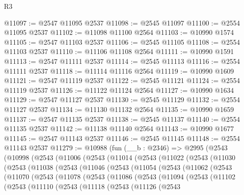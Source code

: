 \begin{lexlean}{R3}
\begin{coremodule}
@11097 := @2547 @11095 @2537
@11098 := @2545 @11097
@11100 := @2554 @11095 @2537
@11102 := @11098 @11100 @2564
@11103 := @10990 @1574
@11105 := @2547 @11103 @2537
@11106 := @2545 @11105
@11108 := @2554 @11103 @2537
@11110 := @11106 @11108 @2564
@11111 := @10990 @1591
@11113 := @2547 @11111 @2537
@11114 := @2545 @11113
@11116 := @2554 @11111 @2537
@11118 := @11114 @11116 @2564
@11119 := @10990 @1609
@11121 := @2547 @11119 @2537
@11122 := @2545 @11121
@11124 := @2554 @11119 @2537
@11126 := @11122 @11124 @2564
@11127 := @10990 @1634
@11129 := @2547 @11127 @2537
@11130 := @2545 @11129
@11132 := @2554 @11127 @2537
@11134 := @11130 @11132 @2564
@11135 := @10990 @1659
@11137 := @2547 @11135 @2537
@11138 := @2545 @11137
@11140 := @2554 @11135 @2537
@11142 := @11138 @11140 @2564
@11143 := @10990 @1677
@11145 := @2547 @11143 @2537
@11146 := @2545 @11145
@11148 := @2554 @11143 @2537
@11279 := @10988
    (fun (__b : @2346) =>
    @2995
      (@2543
        (@10998
          (@2543
            (@11006
              (@2543
                (@11014
                  (@2543
                    (@11022
                      (@2543
                        (@11030
                          (@2543
                            (@11038
                              (@2543
                                (@11046
                                  (@2543
                                    (@11054
                                      (@2543
                                        (@11062
                                          (@2543
                                            (@11070
                                              (@2543
                                                (@11078
                                                  (@2543
                                                    (@11086
                                                      (@2543
                                                        (@11094
                                                          (@2543
                                                            (@11102
                                                              (@2543
                                                                (@11110
                                                                  (@2543
                                                                    (@11118
                                                                      (@2543
                                                                        (@11126
                                                                          (@2543

\end{coremodule}
\end{lexlean}
